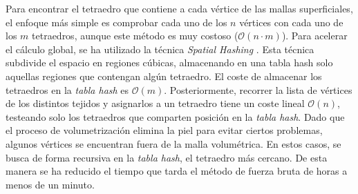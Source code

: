 Para encontrar el tetraedro que contiene a cada vértice de las mallas superficiales, el enfoque más simple es comprobar cada uno de los $n$ vértices con cada uno de los $m$ tetraedros, 
%
aunque este método es muy costoso ($\mathcal{O}(n \cdot m)$). Para acelerar el cálculo global, se ha utilizado la técnica \emph{Spatial Hashing} \cite{Teschner2003}. Esta técnica subdivide el espacio en regiones cúbicas, almacenando en una \ac{tabla hash} solo aquellas regiones que contengan algún tetraedro. El coste de almacenar los tetraedros en la \emph{\ac{tabla hash}} es $\mathcal{O}(m)$. Posteriormente, recorrer la lista de vértices de los distintos tejidos y asignarlos a un tetraedro tiene un coste lineal $\mathcal{O}(n)$, testeando solo los tetraedros que comparten posición en la \emph{\ac{tabla hash}}. Dado que el proceso de volumetrización elimina la piel para evitar ciertos problemas, algunos vértices se encuentran fuera de la malla volumétrica. En estos casos, se busca de forma recursiva en la \emph{\ac{tabla hash}}, el tetraedro más cercano.
De esta manera se ha reducido el tiempo que tarda el método de fuerza bruta de horas a menos de un minuto.




